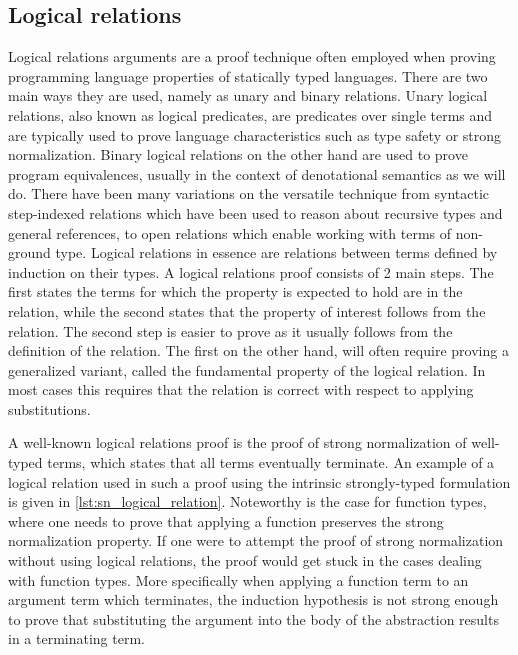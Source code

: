 \subsection{Logical relations}
Logical relations arguments are a proof technique often employed when proving programming language properties of statically typed languages\cite{skorstengaard2019introduction}. There are two main ways they are used, namely as unary and binary relations.
Unary logical relations, also known as logical predicates, are predicates over single terms and are typically used to prove language characteristics such as type safety or strong normalization.
Binary logical relations on the other hand are used to prove program equivalences, usually in the context of denotational semantics as we will do.
There have been many variations on the versatile technique from syntactic step-indexed relations which have been used to reason about recursive types and general references\cite{Ahmed2006}, to open relations which enable working with terms of non-ground type\cite{barthe2020versatility}\cite{huot2020correctness}.
Logical relations in essence are relations between terms defined by induction on their types.
A logical relations proof consists of 2 main steps.
The first states the terms for which the property is expected to hold are in the relation, while the second states that the property of interest follows from the relation.
The second step is easier to prove as it usually follows from the definition of the relation. The first on the other hand, will often require proving a generalized variant, called the fundamental property of the logical relation.
In most cases this requires that the relation is correct with respect to applying substitutions.

A well-known logical relations proof is the proof of strong normalization of well-typed terms, which states that all terms eventually terminate.
An example of a logical relation used in such a proof using the intrinsic strongly-typed formulation is given in \cref{lst:sn_logical_relation}.
Noteworthy is the case for function types, where one needs to prove that applying a function preserves the strong normalization property.
If one were to attempt the proof of strong normalization without using logical relations, the proof would get stuck in the cases dealing with function types.
More specifically when applying a function term to an argument term which terminates, the induction hypothesis is not strong enough to prove that substituting the argument into the body of the abstraction results in a terminating term.

